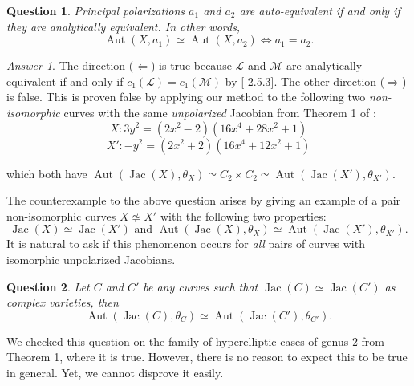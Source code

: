\documentclass[12pt,reqno]{amsart}
\DeclareMathOperator{\Aut}{Aut}
\DeclareMathOperator{\Jac}{Jac}
\newcommand{\mc}{\mathcal}
\newtheorem*{question}{Question}
\theoremstyle{definition}
\theoremstyle{remark}
\newtheorem*{answer}{Answer}
\begin{document}
\begin{question} Principal polarizations $a_1$ and $a_2$ are auto-equivalent if and only if they are analytically equivalent. In other words, $$\Aut(X, a_1) \simeq \Aut(X, a_2) \Leftrightarrow a_1 = a_2.$$ \end{question}

\begin{answer} The direction ($\Leftarrow$) is true because $\mc{L}$ and $\mc{M}$ are analytically equivalent if and only if $c_1(\mc{L}) = c_1(\mc{M})$ by [\cite{bl} 2.5.3]. The other direction ($\Rightarrow$) is false.  This is proven false by applying our method to the following two \textit{non-isomorphic} curves with the same \textit{unpolarized} Jacobian from Theorem 1 of \cite{howe1}:
\vspace{-2pt}
$$X: 3y^2 = (2x^2- 2)(16x^4 + 28x^2 + 1)$$ 
\vspace{-15pt}
$$X': -y^2 = (2x^2 + 2)(16x^4 + 12x^2 + 1)$$ 

\noindent which both have $\Aut(\Jac(X), \theta_X)\simeq C_2 \times C_2 \simeq \Aut(\Jac(X'), \theta_{X'})$. \end{answer}

The counterexample to the above question arises by giving an example of a pair non-isomorphic curves $X \nsimeq X'$ with the following two properties: $$\Jac(X) \simeq \Jac(X') \text{  and  }  \Aut(\Jac(X), \theta_X) \simeq \Aut(\Jac(X'), \theta_{X'}).$$ It is natural to ask if this phenomenon occurs for \textit{all} pairs of curves with isomorphic unpolarized Jacobians. %

\begin{question} Let $C$ and $C'$ be any curves such that $\Jac(C) \simeq \Jac(C')$ as complex varieties, then $$\Aut(\Jac(C), \theta_C) \simeq \Aut(\Jac(C'), \theta_{C'}).$$  \end{question} 

We checked this question on the family of hyperelliptic cases of genus 2 from \cite{howe1} Theorem 1, where it is true. However, there is no reason to expect this to be true in general. Yet, we cannot disprove it easily. 
\end{document}
